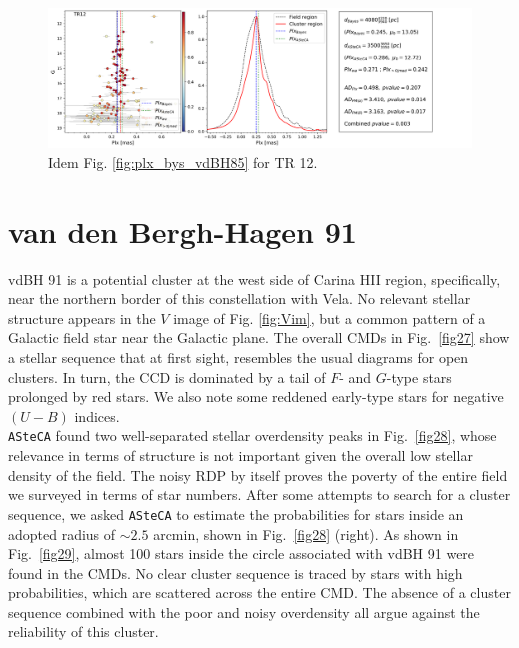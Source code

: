 \documentclass[draft]{aa}
\begin{document}
\begin{figure}[ht]
    \centering
    \includegraphics[width=\hsize]{../figs/plx_TR12.png}
    \caption{Idem Fig. \ref{fig:plx_bys_vdBH85} for TR 12.}
    \label{fig22}
\end{figure}



\section{van den Bergh-Hagen 91}

vdBH 91 is a potential cluster at the west side of Carina HII
region, specifically, near the northern border of this constellation with Vela.
No relevant stellar structure appears in the $V$ image of Fig. \ref{fig:Vim},
but a common pattern of a Galactic field star near the Galactic plane.
The overall CMDs in Fig.~\ref{fig27} show a stellar sequence that at first
sight, resembles the usual diagrams for open clusters. In turn, the CCD
is dominated by a tail of $F$- and $G$-type stars prolonged by red stars. We also note some reddened early-type stars for negative
$(U-B)$ indices.\\

\texttt{ASteCA} found two well-separated stellar overdensity peaks in
Fig.~\ref{fig28}, whose relevance in terms of structure is not
important given the overall low stellar density of the field.
The noisy RDP by itself proves the poverty of the entire field we surveyed in terms
of star numbers.
After some attempts to search for a cluster sequence, we asked \texttt{ASteCA} to
estimate the probabilities for stars inside an adopted radius
of $\sim2.5$ arcmin, shown in Fig.~\ref{fig28} (right).
As shown in Fig.~\ref{fig29}, almost 100 stars inside the circle
associated with vdBH 91 were found in the CMDs.
No clear cluster sequence is traced by stars with high probabilities, which
are scattered across the entire CMD. The absence of a cluster sequence
combined with the poor and noisy overdensity all argue against the reliability of
this cluster.
\end{document}
